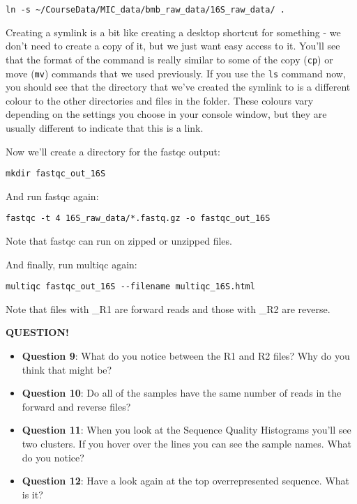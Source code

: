 \documentclass[
]{book}
\providecommand{\tightlist}{%
  \setlength{\itemsep}{0pt}\setlength{\parskip}{0pt}}
\newenvironment{bluebox}{
  \definecolor{shadecolor}{RGB}{172, 210, 237}
  \color{white}
  \begin{shaded}}
 {\end{shaded}}
\begin{document}
\begin{verbatim}
ln -s ~/CourseData/MIC_data/bmb_raw_data/16S_raw_data/ .
\end{verbatim}

Creating a symlink is a bit like creating a desktop shortcut for something - we don't need to create a copy of it, but we just want easy access to it. You'll see that the format of the command is really similar to some of the copy (\texttt{cp}) or move (\texttt{mv}) commands that we used previously. If you use the \texttt{ls} command now, you should see that the directory that we've created the symlink to is a different colour to the other directories and files in the folder. These colours vary depending on the settings you choose in your console window, but they are usually different to indicate that this is a link.

Now we'll create a directory for the fastqc output:

\begin{verbatim}
mkdir fastqc_out_16S
\end{verbatim}

And run fastqc again:

\begin{verbatim}
fastqc -t 4 16S_raw_data/*.fastq.gz -o fastqc_out_16S
\end{verbatim}

Note that fastqc can run on zipped or unzipped files.

And finally, run multiqc again:

\begin{verbatim}
multiqc fastqc_out_16S --filename multiqc_16S.html
\end{verbatim}

Note that files with \_R1 are forward reads and those with \_R2 are reverse.

\begin{bluebox}

\begin{center}
\textbf{QUESTION!}

\end{center}

\begin{itemize}
\tightlist
\item
  \textbf{Question 9}: What do you notice between the R1 and R2 files? Why do you think that might be?
\item
  \textbf{Question 10}: Do all of the samples have the same number of reads in the forward and reverse files?
\item
  \textbf{Question 11}: When you look at the Sequence Quality Histograms you'll see two clusters. If you hover over the lines you can see the sample names. What do you notice?
\item
  \textbf{Question 12}: Have a look again at the top overrepresented sequence. What is it?
\end{itemize}

\end{bluebox}
\end{document}

